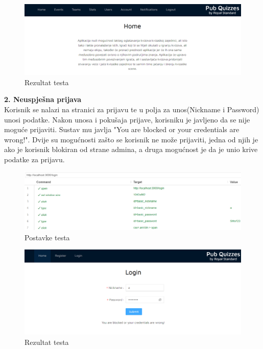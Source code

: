 				\begin{figure}[H]
					\includegraphics[width=\textwidth]{slike/UspjesnaPrijava2.PNG} 
					\caption{Rezultat testa}
					\label{fig:UspjesnaPrijava1}
				\end{figure}
				
			\eject

			\textbf{2. Neuspješna prijava}\\
				
				Korisnik se nalazi na stranici za prijavu te u polja za unos(Nickname i Password) unosi podatke. Nakon unosa i pokušaja prijave, korisniku je javljeno da se nije moguće prijaviti. Sustav mu javlja "You are blocked or your credentials are wrong!". Dvije su mogućnosti zašto se korisnik ne može prijaviti, jedna od njih je ako je korisnik blokiran od strane admina, a druga mogućnost je da je unio krive podatke za prijavu.

				\begin{figure}[H]
					\includegraphics[width=\textwidth]{slike/NeuspjesnaPrijava1.PNG} 
					\caption{Postavke testa}
					\label{fig:NeuspjesnaPrijava1}
				\end{figure}

				\begin{figure}[H]
					\includegraphics[width=\textwidth]{slike/NeuspjesnaPrijava2.PNG} 
					\caption{Rezultat testa}
					\label{fig:NeuspjesnaPrijava2}
				\end{figure}
				
